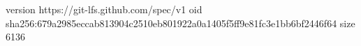 version https://git-lfs.github.com/spec/v1
oid sha256:679a2985eccab813904c2510eb801922a0a1405f5ff9e81fc3e1bb6bf2446f64
size 6136
